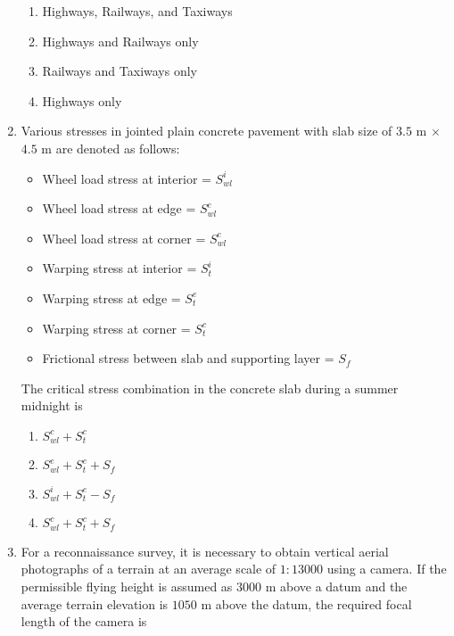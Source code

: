 \documentclass[journal,12pt,onecolumn]{article}
\theoremstyle{remark}
\begin{document}
\begin{enumerate}
    \hfill{}
    \begin{enumerate}
        \item Highways, Railways, and Taxiways
        \item Highways and Railways only
        \item Railways and Taxiways only
        \item Highways only
    \end{enumerate}
    
    \item Various stresses in jointed plain concrete pavement with slab size of
    $3.5$ m $\times$ $4.5$ m are denoted as follows:
   \begin{itemize}
    \item Wheel load stress at interior = $S_{wl}^i$
    \item Wheel load stress at edge = $S_{wl}^e$
    \item Wheel load stress at corner = $S_{wl}^c$
    \item Warping stress at interior = $S_t^i$
    \item Warping stress at edge = $S_t^e$ 
    \item Warping stress at corner = $S_t^c$ 
    \item Frictional stress between slab and supporting layer = $S_f$
    \end{itemize}
    The critical stress combination in the concrete slab during a summer midnight is
    
    \hfill{}
    \begin{enumerate}
        \item $S_{wl}^c + S_t^c$
        \item $S_{wl}^e + S_t^e + S_f$
        \item $S_{wl}^i + S_t^e - S_f$
        \item $S_{wl}^c + S_t^c + S_f$
    \end{enumerate}

    \item For a reconnaissance survey, it is necessary to obtain vertical aerial photographs of
    a terrain at an average scale of $1\colon13000$ using a camera. If the permissible flying
    height is assumed as $3000$ m above a datum and the average terrain elevation is
    $1050$ m above the datum, the required focal length  of the camera is
    
    \hfill{}
    \begin{enumerate}
    \end{enumerate}


\end{enumerate}
\end{document}
